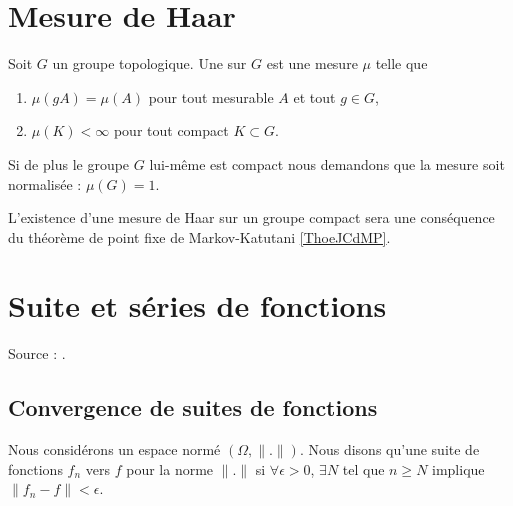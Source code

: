 \section{Mesure de Haar}

\begin{definition}
    Soit \( G\) un groupe topologique. Une  sur \( G\) est une mesure \( \mu\) telle que 
    \begin{enumerate}
        \item
            \( \mu(gA)=\mu(A)\) pour tout mesurable \( A\) et tout \( g\in G\),
        \item
            \( \mu(K)<\infty\) pour tout compact \( K\subset G\).
    \end{enumerate}
    Si de plus le groupe \( G\) lui-même est compact nous demandons que la mesure soit normalisée : \( \mu(G)=1\).
\end{definition}
L'existence d'une mesure de Haar sur un groupe compact sera une conséquence du théorème de point fixe de Markov-Katutani \ref{ThoeJCdMP}.

\section{Suite et séries de fonctions}

Source : \cite{TrenchRealAnalisys}.

\subsection{Convergence de suites de fonctions}

Nous considérons un espace normé \( (\Omega,\| . \|)\). Nous disons qu'une suite de fonctions \( f_n\)  vers \( f\) pour la norme \( \| . \|\) si \( \forall \epsilon>0\), \( \exists N\) tel que \( n\geq N\) implique \( \| f_n-f \|<\epsilon\).

